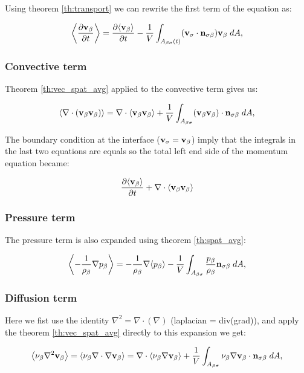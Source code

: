 Using theorem \ref{th:transport} we can rewrite the first term of the equation as:

\begin{equation}
{\left< \dfrac{\partial \textbf{v}_{\beta}}{\partial t} \right>} = \dfrac{\partial {\left< \textbf{v}_{\beta}\right>}}{\partial t} -\dfrac{1}{V} \int_{A_{\beta \sigma}(t)} (\textbf{v}_{\sigma} \cdot \mathbf{n}_{\sigma \beta} ) \textbf{v}_{\beta} \;dA,
\end{equation}

\subsubsection{Convective term}

Theorem \ref{th:vec_spat_avg} applied to the convective term gives us:

\begin{equation}
{\left< \nabla \cdot (\textbf{v}_{\beta}\textbf{v}_{\beta}) \right>} = \nabla \cdot {\left< \textbf{v}_{\beta}\textbf{v}_{\beta}\right>} + \dfrac{1}{V} \int_{A_{\beta \sigma}}  (\textbf{v}_{\beta} \textbf{v}_{\beta}) \cdot \mathbf{n}_{\sigma \beta} \;dA,
\end{equation}

The boundary condition at the interface ($\textbf{v}_{\sigma} = \textbf{v}_{\beta}$) imply that the integrals in the last two equations are equals so the total left end side of the momentum equation became:

\begin{equation}
\dfrac{\partial {\left< \textbf{v}_{\beta}\right>}}{\partial t} + \nabla \cdot {\left< \textbf{v}_{\beta}\textbf{v}_{\beta}\right>}
\label{eq:lhs}
\end{equation}

\subsubsection{Pressure term}
The pressure term is also expanded using theorem \ref{th:spat_avg}:

\begin{equation}
{\left< -\dfrac{1}{\rho_{\beta}} \nabla p_{\beta}\right>} = -\dfrac{1}{\rho_{\beta}} \nabla {\left< p_{\beta}\right>} -\dfrac{1}{V} \int_{A_{\beta \sigma}} \dfrac{p_{\beta}}{\rho_{\beta}} \mathbf{n}_{\sigma \beta} \;dA,
\end{equation}

\subsubsection{Diffusion term}
Here we fist use the identity $\nabla^2 = \nabla \cdot (\nabla)$ (laplacian = div(grad)), and apply the theorem \ref{th:vec_spat_avg} directly to this expansion we get:

\begin{equation}
{\left< \nu_{\beta}\nabla^2 \textbf{v}_{\beta}\right>} = {\left< \nu_{\beta}\nabla \cdot \nabla \textbf{v}_{\beta} \right>} = \nabla \cdot {\left< \nu_{\beta}\nabla \textbf{v}_{\beta}\right>} +\dfrac{1}{V} \int_{A_{\beta \sigma}}  \nu_{\beta} \nabla \textbf{v}_{\beta} \cdot \mathbf{n}_{\sigma \beta} \;dA,
\label{eq:4_1}
\end{equation}


